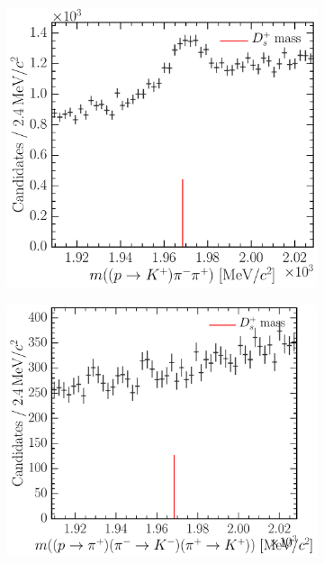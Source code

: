 \begin{figure}
\begin{subfigure}[b]{0.3\textwidth}
    \caption{\decay{\PDsplus}{\PKplus\PKminus\PKplus}}
    \label{fig:cpv:selection:background_study:ppipi_meson:kkk}
  \end{subfigure}
  \begin{subfigure}[b]{0.3\textwidth}
    \includegraphics[width=\textwidth]{figures/cpv/selection/background_study/ppipi/LcToppipi_2012_MagDown_Ds_ppTokp_pim_pip}
    \caption{\decay{\PDsplus}{\PKplus\Ppiminus\Ppiplus}}
    \label{fig:cpv:selection:background_study:ppipi_meson:kpipi}
  \end{subfigure}
  \begin{subfigure}[b]{0.3\textwidth}
    \includegraphics[width=\textwidth]{figures/cpv/selection/background_study/ppipi/LcToppipi_2012_MagDown_Ds_ppTopip_pimTokm_pipTokp}

\end{subfigure}
\end{figure}

